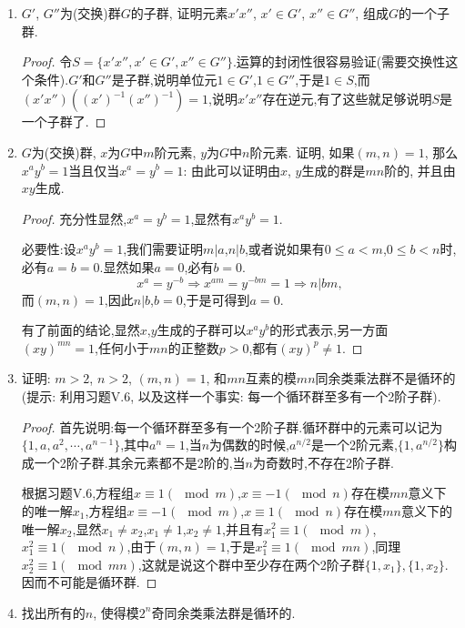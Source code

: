\documentclass[12pt,a4paper]{book} %
\theoremstyle{remark}
\theoremstyle{example}
\theoremstyle{lemma}
\theoremstyle{corollary}
\numberwithin{theorem}{chapter}
\begin{document}
\begin{enumerate}
\item $G'$, $G''$为(交换)群$G$的子群, 证明元素$x'x''$, $x' \in G'$, $x'' \in G''$, 组成$G$的一个子群.

\begin{proof}
令$S = \{x'x'',x' \in G', x'' \in G''\}$.运算的封闭性很容易验证(需要交换性这个条件).$G'$和$G''$是子群,说明单位元$1 \in G'$,$1 \in G''$,于是$1 \in S$,而$(x'x'')((x')^{-1}(x'')^{-1})=1$,说明$x'x''$存在逆元,有了这些就足够说明$S$是一个子群了.
\end{proof}

\item $G$为(交换)群, $x$为$G$中$m$阶元素, $y$为$G$中$n$阶元素. 证明, 如果$(m, n) = 1$, 那么$x^ay^b = 1$当且仅当$x^a = y^b = 1$: 由此可以证明由$x$, $y$生成的群是$mn$阶的, 并且由$xy$生成.

\begin{proof}
充分性显然,$x^a=y^b=1$,显然有$x^ay^b=1$.

必要性:设$x^ay^b=1$,我们需要证明$m|a$,$n|b$,或者说如果有$0 \le a < m$,$0 \le b < n$时,必有$a = b = 0$.显然如果$a = 0$,必有$b=0$.
\[
x^a=y^{-b} \Rightarrow x^{am}=y^{-bm}=1 \Rightarrow n|bm,
\]
而$(m,n)=1$,因此$n|b$,$b=0$,于是可得到$a=0$.

有了前面的结论,显然$x$,$y$生成的子群可以$x^ay^b$的形式表示,另一方面$(xy)^{mn}=1$,任何小于$mn$的正整数$p>0$,都有$(xy)^p \neq 1$.
\end{proof}

\item 证明: $m > 2$, $n > 2$, $(m, n) = 1$, 和$mn$互素的模$mn$同余类乘法群不是循环的 (提示: 利用习题V.6, 以及这样一个事实: 每一个循环群至多有一个2阶子群).

\begin{proof}
首先说明:每一个循环群至多有一个2阶子群.循环群中的元素可以记为$\{1,a,a^2,\cdots,a^{n-1}\}$,其中$a^n=1$,当$n$为偶数的时候,$a^{n/2}$是一个2阶元素,$\{1,a^{n/2}\}$构成一个2阶子群.其余元素都不是2阶的,当$n$为奇数时,不存在2阶子群.

根据习题V.6,方程组$x\equiv 1(\mod{m})$,$x \equiv -1(\mod{n})$存在模$mn$意义下的唯一解$x_1$,方程组$x\equiv -1(\mod{m})$,$x \equiv 1(\mod{n})$存在模$mn$意义下的唯一解$x_2$,显然$x_1 \neq x_2$,$x_1 \neq 1$,$x_2 \neq 1$,并且有$x_1^2 \equiv 1(\mod{m})$,$x_1^2 \equiv 1(\mod{n})$,由于$(m,n)=1$,于是$x_1^2 \equiv 1(\mod{mn})$,同理$x_2^2 \equiv 1(\mod{mn})$,这就是说这个群中至少存在两个2阶子群$\{1,x_1\},\{1,x_2\}$.因而不可能是循环群.
\end{proof}

\item 找出所有的$n$, 使得模$2^n$奇同余类乘法群是循环的.


\end{enumerate}
\end{document}
